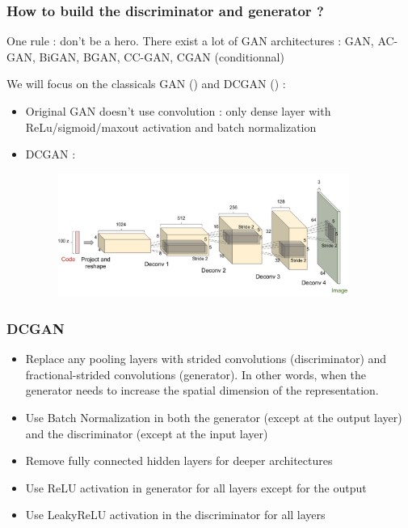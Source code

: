 \documentclass[french,9pt]{beamer}
\begin{document}
\begin{frame}
\frametitle{How to build the discriminator and generator ? }
One rule : don't be a hero. There exist a lot of GAN architectures : GAN, AC-GAN, BiGAN, BGAN, CC-GAN, CGAN (conditionnal)

 We will focus on the classicals GAN (\cite{googfellow2014}) and DCGAN (\cite{2015arXiv151106434R}) :
 
 \begin{itemize}
 \item Original GAN doesn't use convolution : only dense layer with ReLu/sigmoid/maxout activation and batch normalization
 \item DCGAN :
 \begin{figure}
  \begin{center}
    \includegraphics[width=0.9\textwidth]{fig/dcgan_generator.png}
  \end{center}
\end{figure}
 \end{itemize}
 

\end{frame}

\begin{frame}
\frametitle{DCGAN}

\begin{itemize}
\item Replace any pooling layers with strided convolutions (discriminator) and fractional-strided convolutions (generator). In other words, when the generator needs to increase the spatial dimension of the representation.
\item Use Batch Normalization in both the generator (except at the output layer) and the discriminator (except at the input layer)
\item Remove fully connected hidden layers for deeper architectures
\item Use ReLU activation in generator for all layers except for the output
\item Use LeakyReLU activation in the discriminator for all layers
\end{itemize}

\end{frame}
\end{document}
